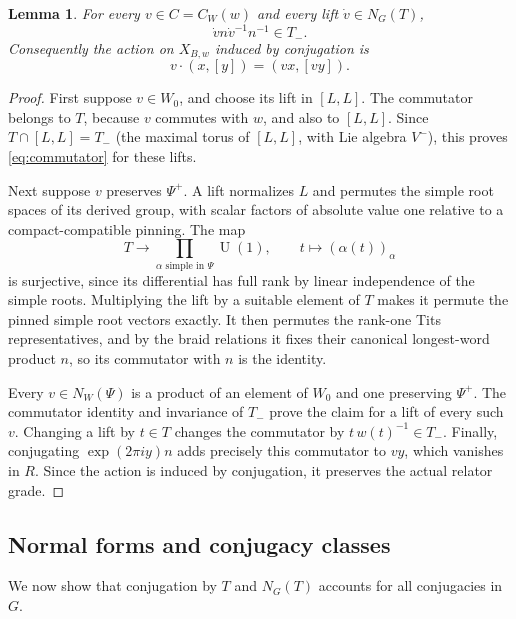 \documentclass[11pt,a4paper,reqno]{amsart}
\theoremstyle{plain}
\newtheorem{lemma}[theorem]{Lemma}
\theoremstyle{definition}
\theoremstyle{remark}
\numberwithin{equation}{section}
\newcommand{\UU}{\operatorname{U}}
\newcommand{\eexp}[1]{\exp(2\pi i #1)}
\begin{document}
\begin{lemma}\label{lem:linearaction} For every $v\in C=C_W(w)$ and every lift $\dot v\in N_G(T)$,
\begin{equation}\label{eq:commutator}
\dot v n\dot v^{-1}n^{-1}\in T_-.
\end{equation}
Consequently the action on $X_{B,w}$ induced by conjugation is
\[
v\cdot(x,[y])=(vx,[vy]).
\]
\end{lemma}
\begin{proof}
First suppose $v\in W_0$, and choose its lift in $[L,L]$. The commutator belongs to $T$, because $v$ commutes with $w$, and also to $[L,L]$. Since $T\cap[L,L]=T_-$ (the maximal torus of $[L,L]$, with Lie algebra $V^-$), this proves \eqref{eq:commutator} for these lifts.

Next suppose $v$ preserves $\Psi^+$. A lift normalizes $L$ and permutes the simple root spaces of its derived group, with scalar factors of absolute value one relative to a compact-compatible pinning. The map
\[
T\longrightarrow\prod_{\alpha\text{ simple in }\Psi}\UU(1), \qquad t\longmapsto(\alpha(t))_\alpha
\]
is surjective, since its differential has full rank by linear independence of the simple roots. Multiplying the lift by a suitable element of $T$ makes it permute the pinned simple root vectors exactly. It then permutes the rank-one Tits representatives, and by the braid relations it fixes their canonical longest-word product $n$, so its commutator with $n$ is the identity.

Every $v\in N_W(\Psi)$ is a product of an element of $W_0$ and one preserving $\Psi^+$. The commutator identity and invariance of $T_-$ prove the claim for a lift of every such $v$. Changing a lift by $t\in T$ changes the commutator by $t\,w(t)^{-1}\in T_-$. Finally, conjugating $\eexp{y}n$ adds precisely this commutator to $vy$, which vanishes in $R$. Since the action is induced by conjugation, it preserves the actual relator grade.
\end{proof}

\subsection{Normal forms and conjugacy classes}

We now show that conjugation by $T$ and $N_G(T)$ accounts for all conjugacies in $G$.
\end{document}
